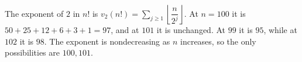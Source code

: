 The exponent of $2$ in $n!$ is $v_2(n!)=\sum_{j\ge1}\left\lfloor\dfrac{n}{2^j}\right\rfloor$. At $n=100$ it is $50+25+12+6+3+1=97$, and at $101$ it is unchanged. At $99$ it is $95$, while at $102$ it is $98$. The exponent is nondecreasing as $n$ increases, so the only possibilities are $\boxed{100,101}$.
